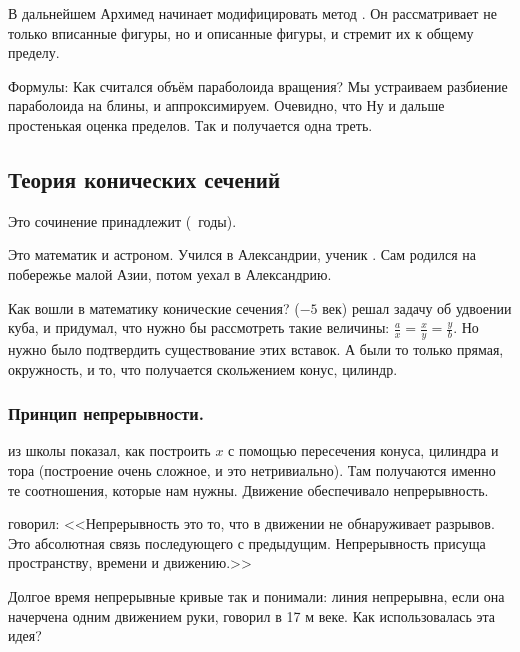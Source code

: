 \documentclass[a4paper,oneside,fleqn,10pt]{article}
\begin{document}
В дальнейшем Архимед начинает модифицировать метод .
Он рассматривает не только вписанные фигуры, но и описанные фигуры,
и стремит их к общему пределу.

Формулы:
Как считался объём параболоида вращения?
Мы устраиваем разбиение параболоида на блины, и аппроксимируем.
Очевидно, что
Ну и дальше простенькая оценка пределов. Так и получается одна треть.


\subsection{Теория конических сечений}

\label{sec:conicae}

Это сочинение принадлежит  (~годы).

Это математик и астроном. Учился в Александрии, ученик . Сам родился на побережье
малой Азии, потом уехал в Александрию.

Как вошли в математику конические сечения?  ($-5$ век) решал задачу об
удвоении куба, и придумал, что нужно бы рассмотреть такие величины:
$\frac ax = \frac xy = \frac yb$. Но нужно было подтвердить существование этих вставок.
А были то только прямая, окружность, и то, что получается скольжением конус, цилиндр.

\subsubsection{Принцип непрерывности.}

 из школы  показал, как построить $x$ с помощью пересечения
конуса, цилиндра и тора (построение очень сложное, и это нетривиально).
Там получаются именно те соотношения, которые нам нужны.
Движение обеспечивало непрерывность.

 говорил: <<Непрерывность это то, что в движении не обнаруживает разрывов.
Это абсолютная связь последующего с предыдущим. Непрерывность присуща
пространству, времени и движению.>>

Долгое время непрерывные кривые так и понимали: линия непрерывна, если она начерчена
одним движением руки, говорил  в 17 м веке.
Как использовалась эта идея?
\end{document}
